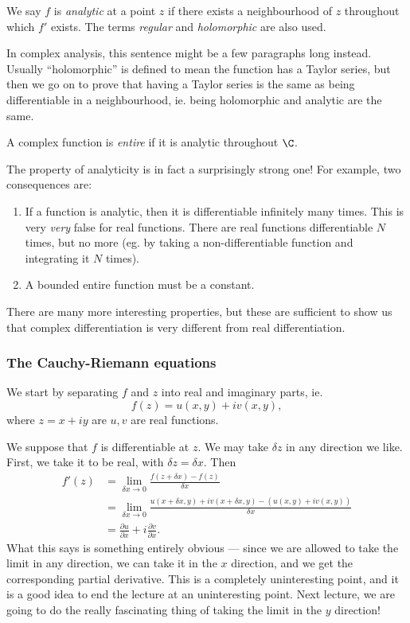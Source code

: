 \documentclass[a4paper]{article}
\begin{document}
\begin{defi}
  We say $f$ is \emph{analytic} at a point $z$ if there exists a neighbourhood of $z$ throughout which $f'$ exists. The terms \emph{regular} and \emph{holomorphic} are also used.
\end{defi}
In complex analysis, this sentence might be a few paragraphs long instead. Usually ``holomorphic'' is defined to mean the function has a Taylor series, but then we go on to prove that having a Taylor series is the same as being differentiable in a neighbourhood, ie. being holomorphic and analytic are the same.

\begin{defi}
  A complex function is \emph{entire} if it is analytic throughout $\C$.
\end{defi}

The property of analyticity is in fact a surprisingly strong one! For example, two consequences are:
\begin{enumerate}
  \item If a function is analytic, then it is differentiable infinitely many times. This is very \emph{very} false for real functions. There are real functions differentiable $N$ times, but no more (eg. by taking a non-differentiable function and integrating it $N$ times).
  \item A bounded entire function must be a constant.
\end{enumerate}
There are many more interesting properties, but these are sufficient to show us that complex differentiation is very different from real differentiation.
\subsubsection*{The Cauchy-Riemann equations}
We start by separating $f$ and $z$ into real and imaginary parts, ie.
\[
  f(z) = u(x, y) + iv(x, y),
\]
where $z = x + iy$ are $u, v$ are real functions.

We suppose that $f$ is differentiable at $z$. We may take $\delta z$ in any direction we like. First, we take it to be real, with $\delta z = \delta x$. Then
\begin{align*}
  f'(z) &= \lim_{\delta x \to 0} \frac{f(z + \delta x) - f(z)}{\delta x}\\
  &= \lim_{\delta x \to 0} \frac{u(x + \delta x, y) + iv(x + \delta x, y) - (u(x, y) + iv(x, y))}{\delta x}\\
  &= \frac{\partial u}{\partial x} + i \frac{\partial v}{\partial x}.
\end{align*}
What this says is something entirely obvious --- since we are allowed to take the limit in any direction, we can take it in the $x$ direction, and we get the corresponding partial derivative. This is a completely uninteresting point, and it is a good idea to end the lecture at an uninteresting point. Next lecture, we are going to do the really fascinating thing of taking the limit in the $y$ direction!
\end{document}
